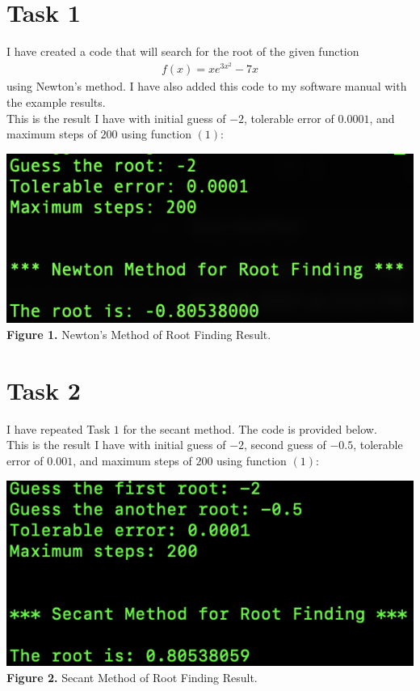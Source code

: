 \documentclass{article}
\begin{document}
\section*{Task 1}
I have created a  code that will search for the root of the given function
\begin{align}
f(x) = xe^{3x^2} - 7x
\end{align}
using Newton's method. I have also added this code to my software manual with the example results.\\

This is the result I have with initial guess of $-2$, tolerable error of $0.0001$, and maximum steps of $200$ using function $(1)$:
\begin{center}
\includegraphics[width=\textwidth]{Screenshots/Newton.png}
{\bf Figure 1.} Newton's Method of Root Finding Result.
\end{center}

\newpage

\section*{Task 2}
I have repeated Task $1$ for the secant method. The code is provided below. \\

This is the result I have with initial guess of $-2$, second guess of $-0.5$, tolerable error of $0.001$, and maximum steps of $200$ using function $(1)$:
\begin{center}
\includegraphics[width=\textwidth]{Screenshots/Secant.png}
{\bf Figure 2.} Secant Method of Root Finding Result.
\end{center}
\end{document}
